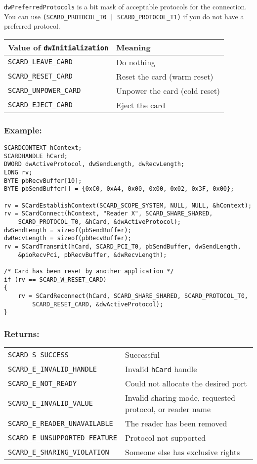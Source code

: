 \documentclass[a4paper,12pt]{article}
\newcommand{\example}{\subsubsection{Example:}}
\newcommand{\returns}{\subsubsection{Returns:}}
\begin{document}
\texttt{dwPreferredProtocols} is a bit mask of acceptable protocols for
the connection. You can use \texttt{(SCARD\_PROTOCOL\_T0 |
SCARD\_PROTOCOL\_T1)} if you do not have a preferred protocol.

\begin{tabular}{|l|l|}
\hline
Value of \texttt{dwInitialization} & Meaning \\
\hline
\hline
\texttt{SCARD\_LEAVE\_CARD} & Do nothing \\
\hline
\texttt{SCARD\_RESET\_CARD} & Reset the card (warm reset) \\
\hline
\texttt{SCARD\_UNPOWER\_CARD} & Unpower the card (cold reset) \\
\hline
\texttt{SCARD\_EJECT\_CARD} & Eject the card \\
\hline
\end{tabular}


\example

\begin{verbatim}
SCARDCONTEXT hContext;
SCARDHANDLE hCard;
DWORD dwActiveProtocol, dwSendLength, dwRecvLength;
LONG rv;
BYTE pbRecvBuffer[10];
BYTE pbSendBuffer[] = {0xC0, 0xA4, 0x00, 0x00, 0x02, 0x3F, 0x00};

rv = SCardEstablishContext(SCARD_SCOPE_SYSTEM, NULL, NULL, &hContext);
rv = SCardConnect(hContext, "Reader X", SCARD_SHARE_SHARED,
    SCARD_PROTOCOL_T0, &hCard, &dwActiveProtocol);
dwSendLength = sizeof(pbSendBuffer);
dwRecvLength = sizeof(pbRecvBuffer);
rv = SCardTransmit(hCard, SCARD_PCI_T0, pbSendBuffer, dwSendLength,
    &pioRecvPci, pbRecvBuffer, &dwRecvLength);

/* Card has been reset by another application */
if (rv == SCARD_W_RESET_CARD)
{
    rv = SCardReconnect(hCard, SCARD_SHARE_SHARED, SCARD_PROTOCOL_T0,
        SCARD_RESET_CARD, &dwActiveProtocol);
}
\end{verbatim}


\returns

\begin{tabular}{ll}
\texttt{SCARD\_S\_SUCCESS} 			& Successful\\
\texttt{SCARD\_E\_INVALID\_HANDLE} 		& Invalid \texttt{hCard} handle\\
\texttt{SCARD\_E\_NOT\_READY} 		& Could not allocate the desired port\\
\texttt{SCARD\_E\_INVALID\_VALUE} 		& Invalid sharing mode, requested protocol, or reader name\\
\texttt{SCARD\_E\_READER\_UNAVAILABLE} 	& The reader has been removed\\
\texttt{SCARD\_E\_UNSUPPORTED\_FEATURE} 	& Protocol not supported\\
\texttt{SCARD\_E\_SHARING\_VIOLATION} 	& Someone else has exclusive rights\\
\end{tabular}
\end{document}
